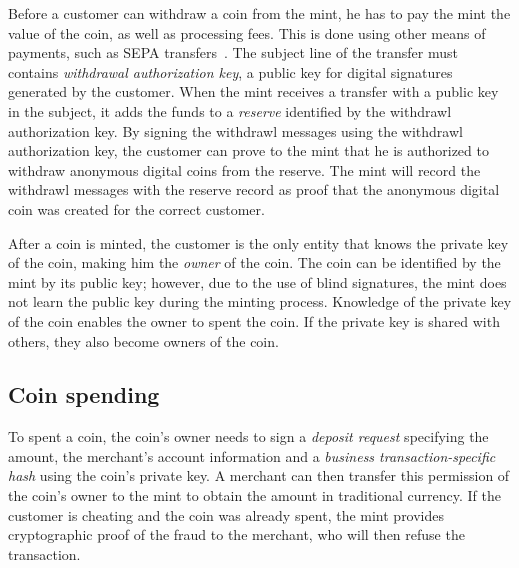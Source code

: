 \documentclass{llncs}
\begin{document}
Before a customer can withdraw a coin from the mint, he has to pay the
mint the value of the coin, as well as processing fees.  This is done
using other means of payments, such as SEPA transfers~\cite{sepa}.
The subject line of the transfer must contains {\em withdrawal
  authorization key}, a public key for digital signatures generated by
the customer.  When the mint receives a transfer with a public key in
the subject, it adds the funds to a {\em reserve} identified by the
withdrawl authorization key.  By signing the withdrawl messages using
the withdrawl authorization key, the customer can prove to the mint
that he is authorized to withdraw anonymous digital coins from the
reserve.  The mint will record the withdrawl messages with the reserve
record as proof that the anonymous digital coin was created for the
correct customer.

After a coin is minted, the customer is the only entity that knows the
private key of the coin, making him the \emph{owner} of the coin.  The
coin can be identified by the mint by its public key; however, due to
the use of blind signatures, the mint does not learn the public key
during the minting process.  Knowledge of the private key of the coin
enables the owner to spent the coin.  If the private key is shared
with others, they also become owners of the coin.

\subsection{Coin spending}

To spent a coin, the coin's owner needs to sign a {\em deposit
  request} specifying the amount, the merchant's account information
and a {\em business transaction-specific hash} using the coin's
private key.  A merchant can then transfer this permission of the
coin's owner to the mint to obtain the amount in traditional currency.
If the customer is cheating and the coin was already spent, the mint
provides cryptographic proof of the fraud to the merchant, who will
then refuse the transaction.

\end{document}

